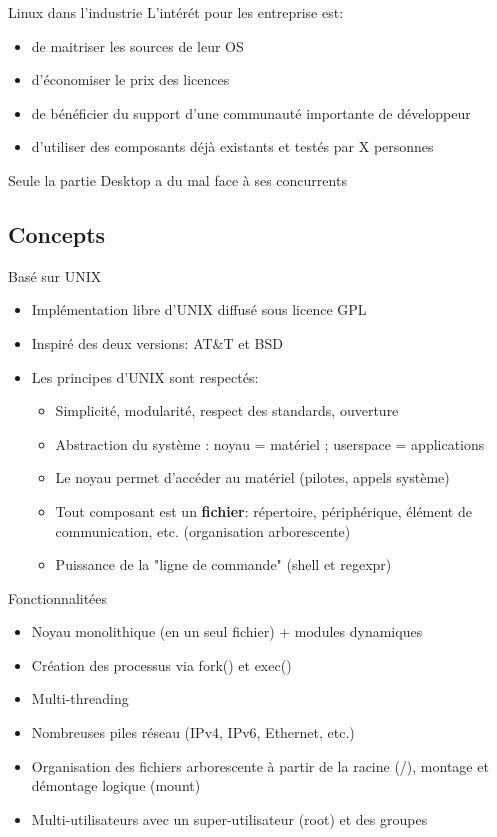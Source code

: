 \begin{frame}{Linux dans l'industrie}{}
  L'intérét pour les entreprise est:
  \begin{itemize}
  \item de maitriser les sources de leur OS
  \item d'économiser le prix des licences
  \item de bénéficier du support d'une communauté importante de développeur
  \item d'utiliser des composants déjà existants et testés par X personnes
  \end{itemize}
  Seule la partie Desktop a du mal face à ses concurrents
 \end{frame}

\subsection{Concepts}

\begin{frame}{Basé sur UNIX}{}
  \begin{itemize}
  \item Implémentation libre d'UNIX diffusé sous licence GPL
  \item Inspiré des deux versions: AT\&T et BSD
  \item Les principes d'UNIX sont respectés:
  \begin{itemize}
  \item Simplicité, modularité, respect des standards, ouverture
  \item Abstraction du système : noyau = matériel ; userspace = applications
  \item Le noyau permet d'accéder au matériel (pilotes, appels système)
  \item Tout composant est un \textbf{fichier}: répertoire, périphérique, élément de communication, etc. (organisation arborescente)
  \item Puissance de la "ligne de commande" (shell et regexpr)
  \end{itemize}
  \end{itemize}
\end{frame}

\begin{frame}{Fonctionnalitées}{}
  \begin{itemize}
  \item Noyau monolithique (en un seul fichier) + modules dynamiques
  \item Création des processus via fork() et exec()
  \item Multi-threading
  \item Nombreuses piles réseau (IPv4, IPv6, Ethernet, etc.)
  \item Organisation des fichiers arborescente à partir de la racine (/), montage et démontage logique (mount)
  \item Multi-utilisateurs avec un super-utilisateur (root) et des groupes
  \end{itemize}
\end{frame}

